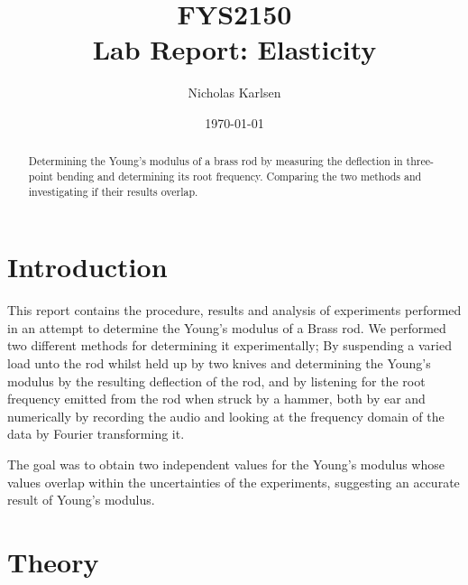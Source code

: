 \documentclass[11pt,a4paper]{article}
\begin{document}

\title{FYS2150 \\ Lab Report: Elasticity}%

\author{Nicholas Karlsen}

\date{\today}%

\maketitle

\begin{abstract}
Determining the Young's modulus of a brass rod by measuring the deflection in three-point bending and determining its root frequency. Comparing the two methods and investigating if their results overlap.
\end{abstract}


\section{\label{sect:intro}Introduction}
  This report contains the procedure, results and analysis of experiments performed in an attempt to determine the Young's modulus of a Brass rod. We performed two different methods for determining it experimentally; By suspending a varied load unto the rod whilst held up by two knives and determining the Young's modulus by the resulting deflection of the rod, and by listening for the root frequency emitted from the rod when struck by a hammer, both by ear and numerically by recording the audio and looking at the frequency domain of the data by Fourier transforming it.

  The goal was to obtain two independent values for the Young's modulus whose values overlap within the uncertainties of the experiments, suggesting an accurate result of Young's modulus. 

\section{\label{sect:theory}Theory}
\end{document}
